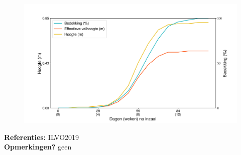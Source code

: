 \documentclass{article}
\begin{document}
 \begin{center} \begin{figure}[H] \includegraphics[width=12.5cm]{temp/1003.png} \end{figure} \end{center} 
  \textbf{Referenties:} ILVO2019 \vspace{0.10cm} \\ 
  \textbf{Opmerkingen?} geen \vspace{0.10cm} \\ 
 \newpage 
\end{document}
